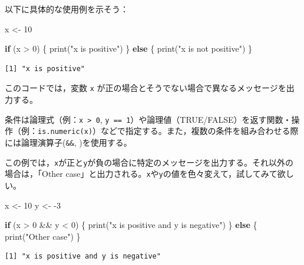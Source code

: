 \documentclass[
  a4paper,
]{ltjsbook}
\newenvironment{Shaded}{\begin{snugshade}}{\end{snugshade}}
\newcommand{\ControlFlowTok}[1]{\textcolor[rgb]{0.00,0.23,0.31}{\textbf{#1}}}
\newcommand{\DecValTok}[1]{\textcolor[rgb]{0.68,0.00,0.00}{#1}}
\newcommand{\FunctionTok}[1]{\textcolor[rgb]{0.28,0.35,0.67}{#1}}
\newcommand{\NormalTok}[1]{\textcolor[rgb]{0.00,0.23,0.31}{#1}}
\newcommand{\OtherTok}[1]{\textcolor[rgb]{0.00,0.23,0.31}{#1}}
\newcommand{\SpecialCharTok}[1]{\textcolor[rgb]{0.37,0.37,0.37}{#1}}
\newcommand{\StringTok}[1]{\textcolor[rgb]{0.13,0.47,0.30}{#1}}
\begin{document}
以下に具体的な使用例を示そう：

\begin{Shaded}
\begin{Highlighting}[]
\NormalTok{x }\OtherTok{\textless{}{-}} \DecValTok{10}

\ControlFlowTok{if}\NormalTok{ (x }\SpecialCharTok{\textgreater{}} \DecValTok{0}\NormalTok{) \{}
  \FunctionTok{print}\NormalTok{(}\StringTok{"x is positive"}\NormalTok{)}
\NormalTok{\} }\ControlFlowTok{else}\NormalTok{ \{}
  \FunctionTok{print}\NormalTok{(}\StringTok{"x is not positive"}\NormalTok{)}
\NormalTok{\}}
\end{Highlighting}
\end{Shaded}

\begin{verbatim}
[1] "x is positive"
\end{verbatim}

このコードでは，変数 \texttt{x}
が正の場合とそうでない場合で異なるメッセージを出力する。

条件は論理式（例：\texttt{x\ \textgreater{}\ 0},
\texttt{y\ ==\ 1}）や論理値（TRUE/FALSE）を返す関数・操作（例：\texttt{is.numeric(x)}）などで指定する。また，複数の条件を組み合わせる際には論理演算子(\texttt{\&\&},
\texttt{\textbar{}\textbar{}})を使用する。

この例では，\texttt{x}が正と\texttt{y}が負の場合に特定のメッセージを出力する。それ以外の場合は，「Other
case」と出力される。\texttt{x}や\texttt{y}の値を色々変えて，試してみて欲しい。

\begin{Shaded}
\begin{Highlighting}[]
\NormalTok{x }\OtherTok{\textless{}{-}} \DecValTok{10}
\NormalTok{y }\OtherTok{\textless{}{-}} \SpecialCharTok{{-}}\DecValTok{3}

\ControlFlowTok{if}\NormalTok{ (x }\SpecialCharTok{\textgreater{}} \DecValTok{0} \SpecialCharTok{\&\&}\NormalTok{ y }\SpecialCharTok{\textless{}} \DecValTok{0}\NormalTok{) \{}
  \FunctionTok{print}\NormalTok{(}\StringTok{"x is positive and y is negative"}\NormalTok{)}
\NormalTok{\} }\ControlFlowTok{else}\NormalTok{ \{}
  \FunctionTok{print}\NormalTok{(}\StringTok{"Other case"}\NormalTok{)}
\NormalTok{\}}
\end{Highlighting}
\end{Shaded}

\begin{verbatim}
[1] "x is positive and y is negative"
\end{verbatim}
\end{document}
